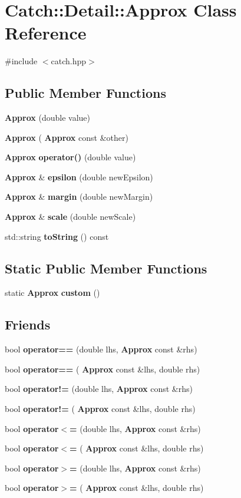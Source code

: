 \section{Catch\+:\+:Detail\+:\+:Approx Class Reference}
\label{class_catch_1_1_detail_1_1_approx}


{\ttfamily \#include $<$catch.\+hpp$>$}

\subsection*{Public Member Functions}
\begin{DoxyCompactItemize}
\item 
\textbf{ Approx} (double value)
\item 
\textbf{ Approx} (\textbf{ Approx} const \&other)
\item 
\textbf{ Approx} \textbf{ operator()} (double value)
\item 
\textbf{ Approx} \& \textbf{ epsilon} (double new\+Epsilon)
\item 
\textbf{ Approx} \& \textbf{ margin} (double new\+Margin)
\item 
\textbf{ Approx} \& \textbf{ scale} (double new\+Scale)
\item 
std\+::string \textbf{ to\+String} () const
\end{DoxyCompactItemize}
\subsection*{Static Public Member Functions}
\begin{DoxyCompactItemize}
\item 
static \textbf{ Approx} \textbf{ custom} ()
\end{DoxyCompactItemize}
\subsection*{Friends}
\begin{DoxyCompactItemize}
\item 
bool \textbf{ operator==} (double lhs, \textbf{ Approx} const \&rhs)
\item 
bool \textbf{ operator==} (\textbf{ Approx} const \&lhs, double rhs)
\item 
bool \textbf{ operator!=} (double lhs, \textbf{ Approx} const \&rhs)
\item 
bool \textbf{ operator!=} (\textbf{ Approx} const \&lhs, double rhs)
\item 
bool \textbf{ operator$<$=} (double lhs, \textbf{ Approx} const \&rhs)
\item 
bool \textbf{ operator$<$=} (\textbf{ Approx} const \&lhs, double rhs)
\item 
bool \textbf{ operator$>$=} (double lhs, \textbf{ Approx} const \&rhs)
\item 
bool \textbf{ operator$>$=} (\textbf{ Approx} const \&lhs, double rhs)
\end{DoxyCompactItemize}


